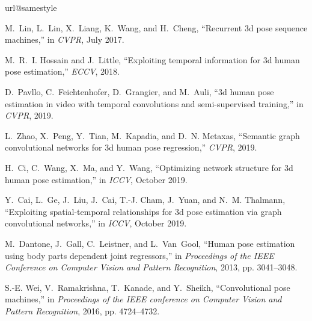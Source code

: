 \documentclass[journal]{IEEEtran}
\begin{document}

\begin{thebibliography}{10}
\providecommand{\url}[1]{#1}
\csname url@samestyle\endcsname
\providecommand{\newblock}{\relax}
\providecommand{\bibinfo}[2]{#2}
\providecommand{\BIBentrySTDinterwordspacing}{\spaceskip=0pt\relax}
\providecommand{\BIBentryALTinterwordstretchfactor}{4}
\providecommand{\BIBentryALTinterwordspacing}{\spaceskip=\fontdimen2\font plus
\BIBentryALTinterwordstretchfactor\fontdimen3\font minus
  \fontdimen4\font\relax}
\providecommand{\BIBforeignlanguage}[2]{{\expandafter\ifx\csname l@#1\endcsname\relax
\typeout{** WARNING: IEEEtran.bst: No hyphenation pattern has been}\typeout{** loaded for the language `#1'. Using the pattern for}\typeout{** the default language instead.}\else
\language=\csname l@#1\endcsname
\fi
#2}}
\providecommand{\BIBdecl}{\relax}
\BIBdecl

M.~Lin, L.~Lin, X.~Liang, K.~Wang, and H.~Cheng, ``Recurrent 3d pose sequence
  machines,'' in \emph{CVPR}, July 2017.

M.~R.~I. Hossain and J.~Little, ``Exploiting temporal information for 3d human
  pose estimation,'' \emph{ECCV}, 2018.

D.~Pavllo, C.~Feichtenhofer, D.~Grangier, and M.~Auli, ``3d human pose
  estimation in video with temporal convolutions and semi-supervised
  training,'' in \emph{CVPR}, 2019.

L.~Zhao, X.~Peng, Y.~Tian, M.~Kapadia, and D.~N. Metaxas, ``Semantic graph
  convolutional networks for 3d human pose regression,'' \emph{CVPR}, 2019.

H.~Ci, C.~Wang, X.~Ma, and Y.~Wang, ``Optimizing network structure for 3d human
  pose estimation,'' in \emph{ICCV}, October 2019.

Y.~Cai, L.~Ge, J.~Liu, J.~Cai, T.-J. Cham, J.~Yuan, and N.~M. Thalmann,
  ``Exploiting spatial-temporal relationships for 3d pose estimation via graph
  convolutional networks,'' in \emph{ICCV}, October 2019.

M.~Dantone, J.~Gall, C.~Leistner, and L.~Van~Gool, ``Human pose estimation
  using body parts dependent joint regressors,'' in \emph{Proceedings of the
  IEEE Conference on Computer Vision and Pattern Recognition}, 2013, pp.
  3041--3048.

S.-E. Wei, V.~Ramakrishna, T.~Kanade, and Y.~Sheikh, ``Convolutional pose
  machines,'' in \emph{Proceedings of the IEEE conference on Computer Vision
  and Pattern Recognition}, 2016, pp. 4724--4732.


\end{thebibliography}
\end{document}
